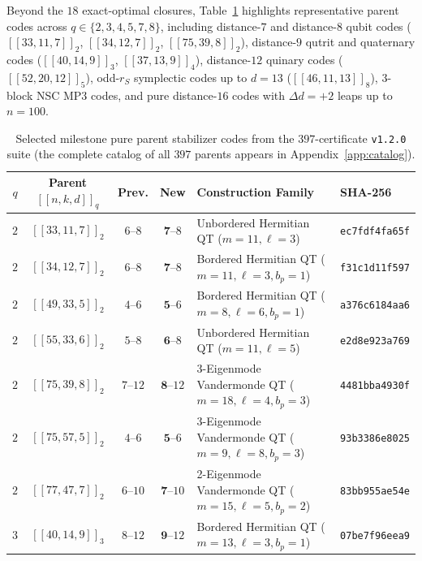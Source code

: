 \documentclass[11pt,a4paper]{article}
\theoremstyle{remark}
\begin{document}
Beyond the $18$ exact-optimal closures, Table~\ref{tab:milestones} highlights representative parent codes across $q \in \{2,\allowbreak 3,\allowbreak 4,\allowbreak 5,\allowbreak 7,\allowbreak 8\}$, including distance-$7$ and distance-$8$ qubit codes ($[[33,11,7]]_2$, $[[34,12,7]]_2$, $[[75,39,8]]_2$), distance-$9$ qutrit and quaternary codes ($[[40,14,9]]_3$, $[[37,13,9]]_4$), distance-$12$ quinary codes ($[[52,20,12]]_5$), odd-$r_S$ symplectic codes up to $d = 13$ ($[[46,11,13]]_8$), $3$-block NSC MP3 codes, and pure distance-$16$ codes with $\Delta d = +2$ leaps up to $n = 100$.

\begin{table}[htbp]
\centering
\caption{Selected milestone pure parent stabilizer codes from the $397$-certificate \texttt{v1.2.0} suite (the complete catalog of all $397$ parents appears in Appendix~\ref{app:catalog}).}\label{tab:milestones}
\vspace{4pt}
{\footnotesize\setlength{\tabcolsep}{5.5pt}\renewcommand{\arraystretch}{1.08}
\begin{tabular}{@{}ccccll@{}}
\toprule
$q$ & Parent $[[n,k,d]]_q$ & Prev. & \textbf{New} & Construction Family & SHA-256 \\
\midrule
$2$ & $[[33,11,7]]_{2}$ & $6\text{--}8$ & $\mathbf{7}\text{--}8$ & Unbordered Hermitian QT ($m=11, \ell=3$) & \texttt{ec7fdf4fa65f} \\
$2$ & $[[34,12,7]]_{2}$ & $6\text{--}8$ & $\mathbf{7}\text{--}8$ & Bordered Hermitian QT ($m=11, \ell=3, b_p=1$) & \texttt{f31c1d11f597} \\
$2$ & $[[49,33,5]]_{2}$ & $4\text{--}6$ & $\mathbf{5}\text{--}6$ & Bordered Hermitian QT ($m=8, \ell=6, b_p=1$) & \texttt{a376c6184aa6} \\
$2$ & $[[55,33,6]]_{2}$ & $5\text{--}8$ & $\mathbf{6}\text{--}8$ & Unbordered Hermitian QT ($m=11, \ell=5$) & \texttt{e2d8e923a769} \\
$2$ & $[[75,39,8]]_{2}$ & $7\text{--}12$ & $\mathbf{8}\text{--}12$ & 3-Eigenmode Vandermonde QT ($m=18, \ell=4, b_p=3$) & \texttt{4481bba4930f} \\
$2$ & $[[75,57,5]]_{2}$ & $4\text{--}6$ & $\mathbf{5}\text{--}6$ & 3-Eigenmode Vandermonde QT ($m=9, \ell=8, b_p=3$) & \texttt{93b3386e8025} \\
$2$ & $[[77,47,7]]_{2}$ & $6\text{--}10$ & $\mathbf{7}\text{--}10$ & 2-Eigenmode Vandermonde QT ($m=15, \ell=5, b_p=2$) & \texttt{83bb955ae54e} \\
\midrule
$3$ & $[[40,14,9]]_{3}$ & $8\text{--}12$ & $\mathbf{9}\text{--}12$ & Bordered Hermitian QT ($m=13, \ell=3, b_p=1$) & \texttt{07be7f96eea9} \\

\end{tabular}}
\end{table}
\end{document}
